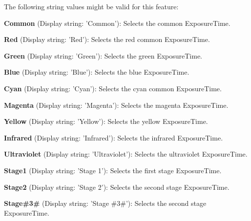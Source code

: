 The following string values might be valid for this feature\+:
\begin{DoxyItemize}
\item {\bfseries Common} (Display string\+: 'Common')\+: Selects the common Exposure\+Time.
\item {\bfseries Red} (Display string\+: 'Red')\+: Selects the red common Exposure\+Time.
\item {\bfseries Green} (Display string\+: 'Green')\+: Selects the green Exposure\+Time.
\item {\bfseries Blue} (Display string\+: 'Blue')\+: Selects the blue Exposure\+Time.
\item {\bfseries Cyan} (Display string\+: 'Cyan')\+: Selects the cyan common Exposure\+Time.
\item {\bfseries Magenta} (Display string\+: 'Magenta')\+: Selects the magenta Exposure\+Time.
\item {\bfseries Yellow} (Display string\+: 'Yellow')\+: Selects the yellow Exposure\+Time.
\item {\bfseries Infrared} (Display string\+: 'Infrared')\+: Selects the infrared Exposure\+Time.
\item {\bfseries Ultraviolet} (Display string\+: 'Ultraviolet')\+: Selects the ultraviolet Exposure\+Time.
\item {\bfseries Stage1} (Display string\+: 'Stage 1')\+: Selects the first stage Exposure\+Time.
\item {\bfseries Stage2} (Display string\+: 'Stage 2')\+: Selects the second stage Exposure\+Time.
\item {\bfseries Stage\#3\#} (Display string\+: 'Stage \#3\#')\+: Selects the second stage Exposure\+Time.
\end{DoxyItemize}

